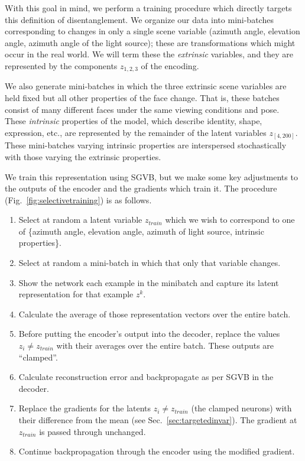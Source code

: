 \documentclass[12pt,twoside]{mitthesis}
\providecommand{\tightlist}{%
  \setlength{\itemsep}{0pt}\setlength{\parskip}{0pt}}
\begin{document}
With this goal in mind, we perform a training procedure which directly
targets this definition of disentanglement. We organize our data into
mini-batches corresponding to changes in only a single scene variable
(azimuth angle, elevation angle, azimuth angle of the light source);
these are transformations which might occur in the real world. We will
term these the \emph{extrinsic} variables, and they are represented by
the components \(z_{1,2,3}\) of the encoding.

We also generate mini-batches in which the three extrinsic scene
variables are held fixed but all other properties of the face change.
That is, these batches consist of many different faces under the same
viewing conditions and pose. These \emph{intrinsic} properties of the
model, which describe identity, shape, expression, etc., are represented
by the remainder of the latent variables \(z_{[4,200]}\). These
mini-batches varying intrinsic properties are interspersed
stochastically with those varying the extrinsic properties.

We train this representation using SGVB, but we make some key
adjustments to the outputs of the encoder and the gradients which train
it. The procedure (Fig.~\ref{fig:selectivetraining}) is as follows.

\begin{enumerate}
\def\labelenumi{\arabic{enumi}.}
\tightlist
\item
  Select at random a latent variable \(z_{train}\) which we wish to
  correspond to one of \{azimuth angle, elevation angle, azimuth of
  light source, intrinsic properties\}.
\item
  Select at random a mini-batch in which that only that variable
  changes.
\item
  Show the network each example in the minibatch and capture its latent
  representation for that example \(z^k\).
\item
  Calculate the average of those representation vectors over the entire
  batch.
\item
  Before putting the encoder's output into the decoder, replace the
  values \(z_i \neq z_{train}\) with their averages over the entire
  batch. These outputs are ``clamped''.
\item
  Calculate reconstruction error and backpropagate as per SGVB in the
  decoder.
\item
  Replace the gradients for the latents \(z_i \neq z_{train}\) (the
  clamped neurons) with their difference from the mean (see
  Sec.~\ref{sec:targetedinvar}). The gradient at \(z_{train}\) is passed
  through unchanged.
\item
  Continue backpropagation through the encoder using the modified
  gradient.
\end{enumerate}
\end{document}
